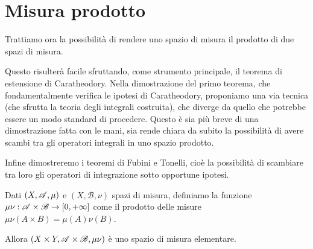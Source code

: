 \section{Misura prodotto}
Trattiamo ora la possibilità di rendere uno spazio di misura il prodotto di due spazi di misura. 

Questo risulterà facile sfruttando, come strumento principale, il teorema di estensione di Caratheodory. 
Nella dimostrazione del primo teorema, che fondamentalmente verifica le ipotesi di Caratheodory, proponiamo una via tecnica (che sfrutta la teoria degli integrali costruita), che diverge da quello che potrebbe essere un modo standard di procedere. Questo è sia più breve di una dimostrazione fatta con le mani, sia rende chiara da subito la possibilità di avere scambi tra gli operatori integrali in uno spazio prodotto. 

Infine dimostreremo i teoremi di Fubini e Tonelli, cioè la possibilità di scambiare tra loro gli operatori di integrazione sotto opportune ipotesi.

\newcommand{\B}{\ensuremath{\mathscr B}}
\begin{theorem}
	Dati $(X,\mathscr A,\mu)$ e $(X,\B,\nu)$ spazi di misura, definiamo la funzione $\mu\nu:\A\times\B\to\Rpiu$ come il prodotto delle misure $\mu\nu(A\times B)=\mu(A)\nu(B)$.
	
	Allora $(X\times Y,\A\times\B,\mu\nu)$ è uno spazio di misura elementare.
\end{theorem}
